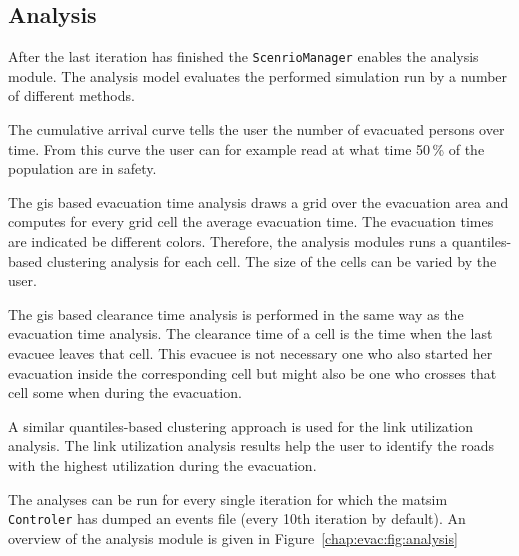 \subsection{Analysis}
After the last iteration has finished the \lstinline|ScenrioManager| enables the analysis module. The analysis model evaluates the performed simulation run by a number of different methods. 
\begin{compactitem}
\item The cumulative arrival curve tells the user the number of evacuated persons over time. From this curve the user can for example read at what time 50\,\% of the population are in safety.
\item The \gls{gis} based evacuation time analysis draws a grid over the evacuation area and computes for every grid cell the average evacuation time. The evacuation times are indicated be different colors. Therefore, the analysis modules runs a quantiles-based clustering analysis for each cell. The size of the cells can be varied  by the user.
\item The \gls{gis} based clearance time analysis is performed in the same way as the evacuation time  analysis. The clearance time of a cell is the time when the last evacuee leaves that cell. This evacuee is not necessary one who also started her evacuation inside the corresponding cell but might also be one who crosses that cell some when during the evacuation.
\item A similar quantiles-based clustering approach is used for the link utilization analysis. The link utilization analysis results help the user to identify the roads with the highest utilization during the evacuation.
\end{compactitem}
The analyses can be run for every single iteration for which the \gls{matsim} \lstinline|Controler| has dumped an events file (every 10th iteration by default). An overview of the analysis module is given in Figure~\ref{chap:evac:fig:analysis}

